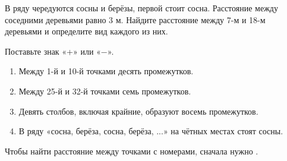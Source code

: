 \begin{thinkbox}
  В ряду чередуются сосны и берёзы, первой стоит сосна. Расстояние между
  соседними деревьями равно \(3\) м. Найдите расстояние между 7-м и 18-м
  деревьями и определите вид каждого из них.
\end{thinkbox}

\begin{checkpointbox}
  Поставьте знак «+» или «−».
  \begin{enumerate}[label=\alph*),itemsep=0.55em]
    \item Между 1-й и 10-й точками десять промежутков. \answerblank[12mm]
    \item Между 25-й и 32-й точками семь промежутков. \answerblank[12mm]
    \item Девять столбов, включая крайние, образуют восемь промежутков.
      \answerblank[12mm]
    \item В ряду «сосна, берёза, сосна, берёза, ...» на чётных местах стоят
      сосны. \answerblank[12mm]
  \end{enumerate}
\end{checkpointbox}

\begin{reflectionbox}[Итог]
  Чтобы найти расстояние между точками с номерами, сначала нужно
  \answerblank[100mm].
\end{reflectionbox}
